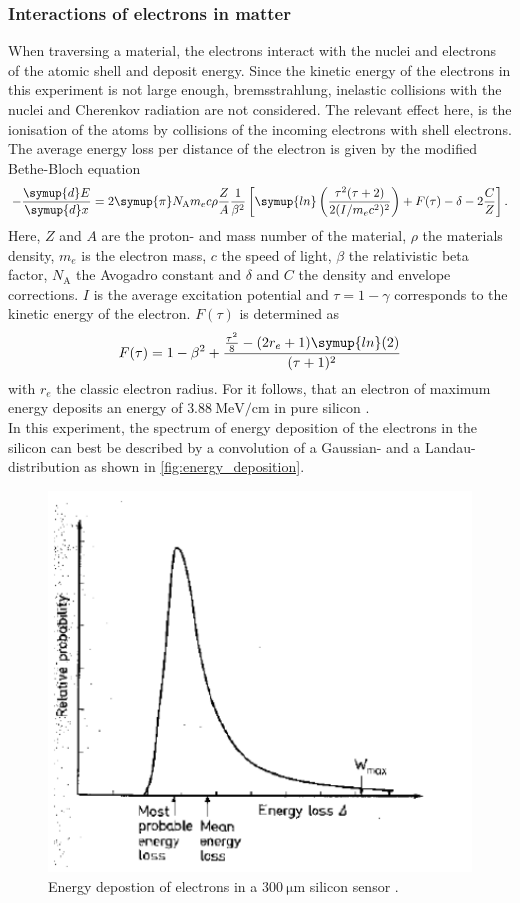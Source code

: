 \subsubsection{Interactions of electrons in matter}
\label{sec:therory_interactions}
When traversing a material, the electrons interact with the nuclei and electrons of the atomic shell and deposit energy. Since the kinetic energy of the electrons in this experiment
is not large enough, bremsstrahlung, inelastic collisions with the nuclei and Cherenkov radiation are not considered. The relevant effect here, is the ionisation of the atoms by 
collisions of the incoming electrons with shell electrons. The average energy loss per distance of the electron is given by the modified Bethe-Bloch equation \cite{Leo1987}
\begin{equation}
    -\frac{\symup{d}E}{\symup{d}x} = 2 \symup{\pi} N_\text{A} m_e c \rho \frac{Z}{A} \frac{1}{\beta^2}
    \left[ \symup{ln}\left(\frac{\tau^2(\tau +2)}{2(I/m_ec^2)^2}\right) + F(\tau) -\delta -2 \frac{C}{Z}\right].
    \label{eq:bethe_bloch}
\end{equation}
Here, $Z$ and $A$ are the proton- and mass number of the material, $\rho$ the materials density, $m_e$ is the electron mass, $c$ the speed of light, 
$\beta$ the relativistic beta factor, $N_\text{A}$ the Avogadro constant and $\delta$ and $C$ the density and envelope corrections. $I$ is the average excitation potential and 
$\tau = 1 - \gamma$ corresponds to the kinetic energy of the electron. $F(\tau)$ is determined as
\begin{equation*}
    F(\tau) = 1-\beta^2 + \frac{\frac{\tau^2}{8}- (2r_e + 1)\symup{ln}(2)}{(\tau+1)^2}
\end{equation*}
with $r_e$ the classic electron radius. For  it follows, that an electron of maximum energy deposits an energy of $\qty{3.88}{\mega\eV\per\cm}$ in pure 
silicon \cite{SiliconStrip}. \\
In this experiment, the spectrum of energy deposition of the electrons in the silicon can best be described by a convolution of a Gaussian- and a Landau- distribution as shown
in \autoref{fig:energy_deposition}.
\begin{figure}
    \centering 
    \includegraphics[width = .5\textwidth]{content/pics/energy_deposition.png}
    \caption{Energy depostion of electrons in a $\qty{300}{\micro\meter}$ silicon sensor \cite{SiliconStrip}.}
    \label{fig:energy_deposition}
\end{figure}

